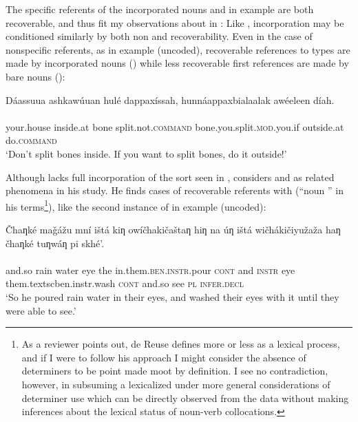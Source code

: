 \documentclass[output=paper]{LSP/langsci}
\begin{document}
	The specific referents of the incorporated nouns  and  in example  are both recoverable, and thus fit my observations about  in : Like , incorporation may be conditioned similarly by both non and recoverability. Even in the case of nonspecific referents, as in example  (uncoded), recoverable references to types are made by incorporated nouns () while less recoverable first references are made by bare nouns ():
	 
\ea\label{splitbones}
 	Dáassuua ashkawúuan hulé dappaxíssah, hunnáappaxbialaalak awéeleen díah.\rmfnm\\
\gll	{}															\\
	your.house		inside.at		bone		split.not.\textsc{command}	bone.you.split.\textsc{mod}.you.if	outside.at		do.\textsc{command}\\
\glt	`Don’t split bones inside. If you want to split bones, do it outside!' 
\z

	Although  lacks full incorporation of the sort seen in , \citet{deReuse1994} considers  and  as related phenomena in his study. He finds cases of recoverable referents with  (“noun ” in his terms\footnote{As a reviewer points out, de Reuse defines  more or less as a lexical process, and if I were to follow his approach I might consider the absence of determiners to be point made moot by definition. I see no contradiction, however, in subsuming a lexicalized  under more general considerations of determiner use which can be directly observed from the data without making inferences about the lexical status of noun-verb collocations.}), like the second instance of  in example  (uncoded):
	
\ea\label{lakhotaeye}
 	Čhaƞké maǧážu mní ištá kiƞ owíčhakičaštaƞ hiƞ na úƞ ištá wičhákičiyužaža haƞ čhaƞké tuƞwáƞ pi skhé’.\rmfnm\\
\gll	{}																												\\
	and.so	rain		water	eye	the	in.them.\textsc{ben.instr}.pour	\textsc{cont}	and	\textsc{instr}	eye		them.textsc{ben.instr}.wash	\textsc{cont}	and.so	see		\textsc{pl}	\textsc{infer.decl}\\
\glt	`So he poured rain water in their eyes, and washed their eyes with it until they were able to see.'
\z
\end{document}
